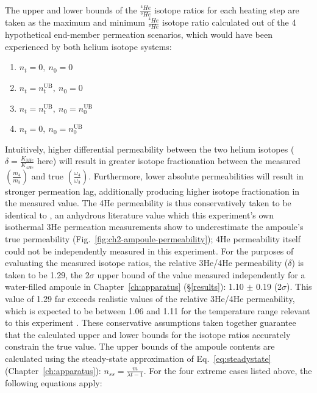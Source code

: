 The upper and lower bounds of the $\frac{^4He}{^3He}$ isotope ratios for each heating step are taken as the maximum and minimum  $\frac{^4He}{^3He}$ 
isotope ratio calculated out of the 4 hypothetical end-member permeation scenarios, which would have been experienced by both helium isotope systems:

\begin{enumerate}
\item $n_t = 0,\ n_0 = 0$
\item $n_t = n_t^{\mathrm{UB}},\ n_0 = 0$
\item $n_t = n_t^{\mathrm{UB}},\ n_0 = n_0^{\mathrm{UB}}$
\item $n_t = 0,\ n_0 = n_0^{\mathrm{UB}}$
\end{enumerate}

Intuitively, higher differential permeability between the two helium isotopes ($\delta = \frac{K_{3He}}{K_{4He}}$ here) will result in greater isotope fractionation between the measured $\left(\frac{m_{4}}{m_{3}}\right)$ and true $\left(\frac{\omega_{4}}{\omega_{3}}\right)$.
Furthermore, lower absolute permeabilities will result in stronger permeation lag, additionally producing higher isotope fractionation in the measured value. The 4He permeability is thus conservatively taken to be identical to \citet{swets1961}, an anhydrous
literature value which this experiment's own isothermal 3He permeation measurements show to underestimate the ampoule's true permeability (Fig.~\ref{fig:ch2-ampoule-permeability}); 4He permeability itself could not be independently measured in this experiment. For the purposes of evaluating the measured isotope ratios, the relative 3He/4He permeability ($\delta$) is taken to be 1.29, the 2$\sigma$ upper bound of the value measured independently for a water-filled ampoule in Chapter~\ref{ch:apparatus} (\S\ref{results}):
1.10 $\pm$ 0.19 (2$\sigma$). This value of 1.29 far exceeds realistic values of the relative 3He/4He permeability, which is expected to be between 1.06 and 1.11 for the temperature range relevant to this experiment \citep{jones1953}. These
conservative assumptions taken together guarantee that the calculated upper and lower bounds for the isotope ratios accurately constrain the true value. The upper bounds of the
ampoule contents are calculated using the steady-state approximation of Eq.~\eqref{eq:steadystate} (Chapter~\ref{ch:apparatus}): $n_{ss} = \frac{m}{\lambda t - 1}$. For the four extreme cases listed above, the following equations apply:


